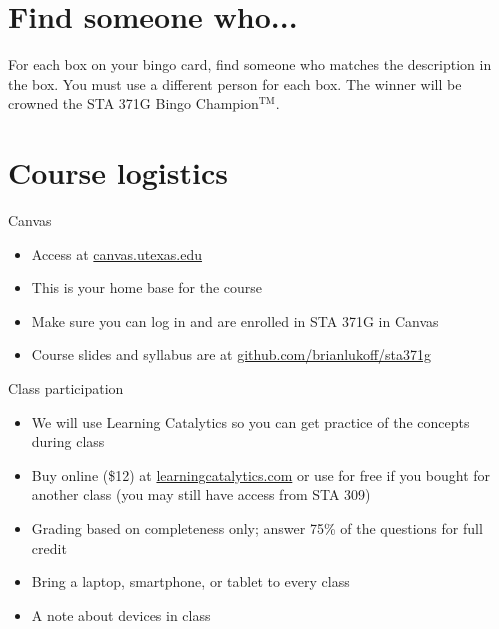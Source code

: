 \documentclass{beamer}\usepackage[]{graphicx}\usepackage[]{color}
\begin{document}
\begin{darkframes}
    \section{Find someone who...}
    
    \begin{frame}{}
      \begin{center}
        For each box on your bingo card, find someone who matches the description in the box. You must use a different person for each box.
        \vfill
        The winner will be crowned the STA 371G Bingo Champion$^{\text{TM}}$.
      \end{center}
    \end{frame}

    \section{Course logistics}

    \begin{frame}{Canvas}
      \begin{itemize}
        \item Access at \url{canvas.utexas.edu}
        \item This is your home base for the course
        \item Make sure you can log in and are enrolled in STA 371G in Canvas
        \item Course slides and syllabus are at \url{github.com/brianlukoff/sta371g}
      \end{itemize}
    \end{frame}

    \begin{frame}{Class participation}
      \begin{itemize}
        \item We will use \alert{Learning Catalytics} so you can get practice of the concepts during class
        \item Buy online (\$12) at \url{learningcatalytics.com} or use for free if you bought for another class (you may still have access from STA 309)
        \item Grading based on completeness only; answer 75\% of the questions for full credit
        \item Bring a laptop, smartphone, or tablet to every class
        \item A note about devices in class
      \end{itemize}
    \end{frame}


\end{darkframes}
\end{document}
